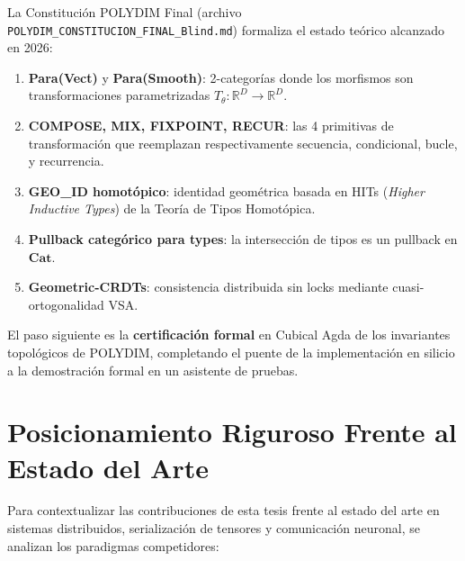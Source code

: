 La Constitución POLYDIM Final (archivo \texttt{POLYDIM\_CONSTITUCION\_FINAL\_Blind.md})
formaliza el estado teórico alcanzado en 2026:

\begin{enumerate}
\item \textbf{Para(Vect)} y \textbf{Para(Smooth)}: 2-categorías donde los morfismos
son transformaciones parametrizadas $T_\theta: \mathbb{R}^D \to \mathbb{R}^D$.

\item \textbf{COMPOSE, MIX, FIXPOINT, RECUR}: las 4 primitivas de transformación que
reemplazan respectivamente secuencia, condicional, bucle, y recurrencia.

\item \textbf{GEO\_ID homotópico}: identidad geométrica basada en HITs
(\textit{Higher Inductive Types}) de la Teoría de Tipos Homotópica.

\item \textbf{Pullback categórico para types}: la intersección de tipos es un pullback en $\mathbf{Cat}$.

\item \textbf{Geometric-CRDTs}: consistencia distribuida sin locks mediante cuasi-ortogonalidad VSA.
\end{enumerate}

El paso siguiente es la \textbf{certificación formal} en Cubical Agda de los
invariantes topológicos de POLYDIM, completando el puente de la implementación
en silicio a la demostración formal en un asistente de pruebas.

\section{Posicionamiento Riguroso Frente al Estado del Arte}


Para contextualizar las contribuciones de esta tesis frente al estado del arte en sistemas distribuidos, 
serialización de tensores y comunicación neuronal, se analizan los paradigmas competidores:

